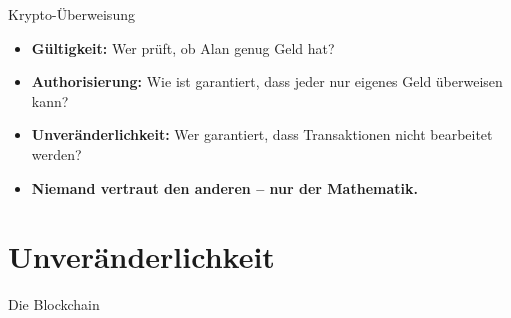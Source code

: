 \documentclass[aspectratio=169]{beamer}
\begin{document}
\begin{frame}{Krypto-Überweisung}
    \pause
    \begin{itemize}
        \item \textbf{Gültigkeit:} Wer prüft, ob Alan genug Geld hat?
        \item \textbf{Authorisierung:} Wie ist garantiert, dass jeder nur eigenes Geld überweisen kann?
        \item \textbf{Unveränderlichkeit:} Wer garantiert, dass Transaktionen nicht bearbeitet werden?
        \item \textbf{Niemand vertraut den anderen -- nur der Mathematik.}
    \end{itemize}
\end{frame}


\section{Unveränderlichkeit}

\begin{frame}[fragile]{Die Blockchain}
    \begin{center}
        \hspace{0.7cm}
        \hspace{0.7cm}
    \end{center}
\end{frame}
\end{document}

